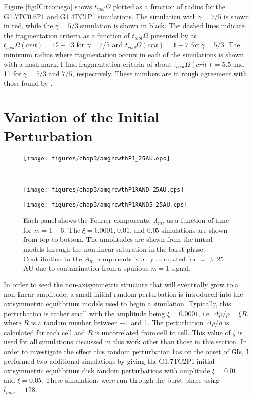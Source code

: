 Figure \ref{fig:IC:tcomega} shows $t_{cool}\Omega$ plotted as a function of radius for the G1.7TC0.6P1 and G1.4TC1P1 simulations. The simulation with $\gamma = 7/5$ is shown in red, while the $\gamma = 5/3$ simulation is shown in black. The dashed lines indicate the fragmentation criteria as a function of $t_{cool}\Omega$ presented by \citet{rice2005} as $t_{cool}\Omega (crit) = 12-13$ for $\gamma = 7/5$ and $t_{cool}\Omega (crit) = 6-7$ for $\gamma = 5/3$. The minimum radius where fragmentation occurs in each of the simulations is shown with a hash mark. I find fragmentation criteria of about $t_{cool}\Omega (crit) = 5.5$ and 11 for $\gamma = 5/3$ and $7/5$, respectively. These numbers are in rough agreement with those found by \citeauthor{rice2005}. 

\section{Variation of the Initial Perturbation}\label{sec:IC:randpert}

\begin{figure}[p]
\centering
{}
\begin{minipage}[t]{6.3in}
\centering
\texttt{[image: figures/chap3/amgrowthP1\_25AU.eps]}
\end{minipage}\\
\begin{minipage}[t]{6.3in}
\centering
\texttt{[image: figures/chap3/amgrowthP1RAND\_25AU.eps]}
\end{minipage}
\begin{minipage}[t]{6.3in}
\centering
\texttt{[image: figures/chap3/amgrowthP1RAND5\_25AU.eps]}
\end{minipage}
\caption[Fourier components as a function of time for different initial random perturbation amplitudes]{Each panel shows the Fourier components, $A_m$, as a function of time for $m = 1 - 6$. The $\xi = 0.0001$, $0.01$, and $0.05$ simulations are shown from top to bottom. The amplitudes are shown from the initial models through the non-linear saturation in the burst phase. Contribution to the $A_m$ components is only calculated for $\varpi > 25$ AU due to contamination from a spurious $m = 1$ signal.}
\label{fig:IC:amtpert}
\end{figure}

In order to seed the non-axisymmetric structure that will eventually grow to a non-linear amplitude, a small initial random perturbation is introduced into the axisymmetric equilibrium models used to begin a simulation. Typically, this perturbation is rather small with the amplitude being $\xi = 0.0001$, i.e. $\Delta \rho /\rho = \xi R$, where $R$ is a random number between $-1$ and 1. The perturbation $\Delta \rho /\rho$ is calculated for each cell and $R$ is uncorrelated from cell to cell. This value of $\xi$ is used for all simulations discussed in this work other than those in this section. In order to investigate the effect this random perturbation has on the onset of GIs, I performed two additional simulations by giving the G1.7TC2P1 initial axisymmetric equilibrium disk random perturbations with amplitude $\xi = 0.01$ and $\xi = 0.05$. These simulations were run through the burst phase using $l_{max} =128$. 

